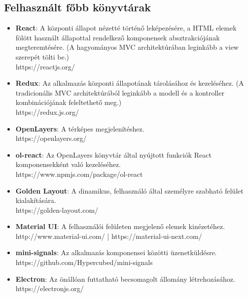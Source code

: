 \subsection{Felhasznált főbb könyvtárak}

\begin{itemize}
  \item \textbf{React}: A központi állapot nézetté történő leképezésére, a HTML
  elemek fölött használt állapottal rendelkező komponensek absztrakciójának
  megteremtésére. (A hagyományos MVC architektúrában leginkább a view szerepét
  tölti be.) \\
  https://reactjs.org/

  \item \textbf{Redux}: Az alkalmazás központi állapotának tárolásához és
  kezeléséhez. (A tradicionális MVC architektúrából leginkább a modell és a
  kontroller kombinációjának feleltethető meg.) \\
  https://redux.js.org/

  \item \textbf{OpenLayers}: A térképes megjelenítéshez. \\
  https://openlayers.org/

  \item \textbf{ol-react}: Az OpenLayers könyvtár által nyújtott funkciók React
  komponensekként való kezeléséhez. \\
  https://www.npmjs.com/package/ol-react

  \item \textbf{Golden Layout}: A dinamikus, felhasználó által személyre szabható
  felület kialakítására. \\
  https://golden-layout.com/

  \item \textbf{Material UI}: A felhasználói felületen megjelenő elemek
  kinézetéhez. \\
  http://www.material-ui.com/ | https://material-ui-next.com/

  \item \textbf{mini-signals}: Az alkalmazás komponensei közötti üzenetküldésre.
  \\
  https://github.com/Hypercubed/mini-signals

  \item \textbf{Electron}: Az önállóan futtatható becsomagolt állomány
  létrehozásához. \\
  https://electronjs.org/
\end{itemize}

